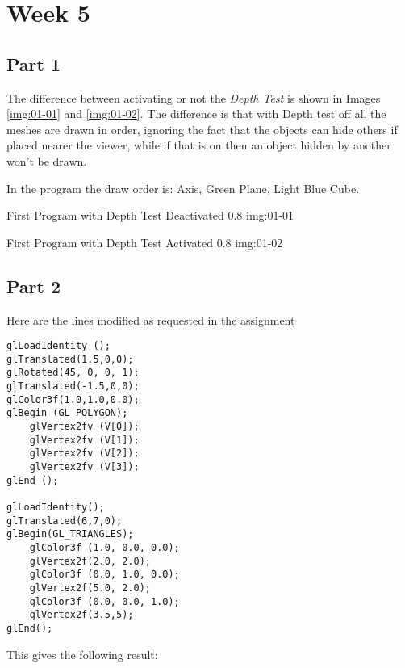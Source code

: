 \chapter{Week 5}

\section{Part 1}
  The difference between activating or not the \emph{Depth Test} is shown in Images \ref{img:01-01}
  and \ref{img:01-02}. The difference is that with Depth test off all the meshes are drawn in order,
  ignoring the fact that the objects can hide others if placed nearer the viewer, while if that is on 
  then an object hidden by another won't be drawn.

  In the program the draw order is: Axis, Green Plane, Light Blue Cube.

        {First Program with Depth Test Deactivated}
        {0.8}
        {img:01-01}

        {First Program with Depth Test Activated}
        {0.8}
        {img:01-02}


\section{Part 2}

Here are the lines modified as requested in the assignment
\begin{lstlisting}[caption=Snapshot from Part2.cpp]
glLoadIdentity ();
glTranslated(1.5,0,0);
glRotated(45, 0, 0, 1);
glTranslated(-1.5,0,0);
glColor3f(1.0,1.0,0.0);
glBegin (GL_POLYGON);
    glVertex2fv (V[0]);
    glVertex2fv (V[1]);
    glVertex2fv (V[2]);
    glVertex2fv (V[3]);
glEnd ();

glLoadIdentity();
glTranslated(6,7,0);
glBegin(GL_TRIANGLES);
    glColor3f (1.0, 0.0, 0.0);
    glVertex2f(2.0, 2.0);
    glColor3f (0.0, 1.0, 0.0);
    glVertex2f(5.0, 2.0);
    glColor3f (0.0, 0.0, 1.0);
    glVertex2f(3.5,5);
glEnd();
\end{lstlisting}

This gives the following result:






